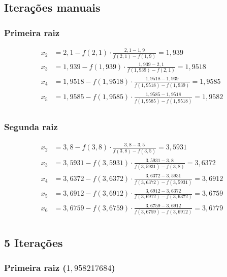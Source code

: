 \documentclass[12pt]{article}
\begin{document}
\subsection{Iterações manuais}
\subsubsection{Primeira raiz}
\begin{align*}
    x_2 &= 2,1 - f(2,1) \cdot \frac{2,1 - 1,9}{f(2,1) - f(1,9)} = 1,939\\
    x_3 &= 1,939 - f(1,939) \cdot \frac{1,939 - 2,1}{f(1,939) - f(2,1)} = 1,9518\\
    x_4 &= 1,9518 - f(1,9518) \cdot \frac{1,9518 - 1,939}{f(1,9518) - f(1,939)} = 1,9585\\
    x_5 &= 1,9585 - f(1,9585) \cdot \frac{1,9585 - 1,9518}{f(1,9585) - f(1,9518)} = 1,9582\\
\end{align*}
\subsubsection{Segunda raiz}
\begin{align*}
    x_2 &= 3,8 - f(3,8) \cdot \frac{3,8 - 3,5}{f(3,8) - f(3,5)} = 3,5931\\
    x_3 &= 3,5931 - f(3,5931) \cdot \frac{3,5931 - 3,8}{f(3,5931) - f(3,8)} = 3,6372\\
    x_4 &= 3,6372 - f(3,6372) \cdot \frac{3,6372 - 3,5931}{f(3,6372) - f(3,5931)} = 3,6912\\
    x_5 &= 3,6912 - f(3,6912) \cdot \frac{3,6912 - 3,6372}{f(3,6912) - f(3,6372)} = 3,6759\\
    x_6 &= 3,6759 - f(3,6759) \cdot \frac{3,6759 - 3,6912}{f(3,6759) - f(3,6912)} = 3,6779\\
\end{align*}

\subsection{5 Iterações}
\subsubsection{Primeira raiz (\(1,958217684\))}
\end{document}
